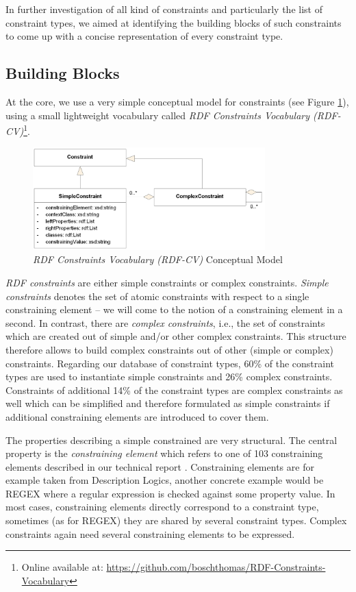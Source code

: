 \documentclass[a4paper,fontsize=11pt]{scrartcl}
\newcommand{\tb}[1]{\todo[size=\small, color=green!40]{\textbf{Thomas:} #1}}
\begin{document}
In further investigation of all kind of constraints and particularly the list of constraint types, we aimed at identifying the building blocks of such constraints to come up with a concise representation of every constraint type. 

\subsection{Building Blocks}

At the core, we use a very simple conceptual model for constraints (see Figure \ref{fig:RDF-CV-conceptual-model}), using a small lightweight vocabulary called \emph{RDF Constraints Vocabulary (RDF-CV)}\footnote{Online available at: \url{https://github.com/boschthomas/RDF-Constraints-Vocabulary}}.\tb{ToDo: actualize vocabulary}
\begin{figure}[H]
	\centering
		\includegraphics[width=0.80\textwidth]{images/RDF-CV.png}
	\caption{\emph{RDF Constraints Vocabulary (RDF-CV)} Conceptual Model}
	\label{fig:RDF-CV-conceptual-model}
\end{figure}

\emph{RDF constraints} are either simple constraints or complex constraints. \emph{Simple constraints} denotes the set of atomic constraints with respect to a single constraining element -- we will come to the notion of a constraining element in a second. In contrast, there are \emph{complex constraints}, i.e., the set of constraints which are created out of simple and/or other complex constraints. This structure therefore allows to build complex constraints out of other (simple or complex) constraints. Regarding our database of constraint types, 60\% of the constraint types are used to instantiate simple constraints and 26\% complex constraints. 
Constraints of additional 14\% of the constraint types are complex constraints as well which can be simplified and therefore formulated as simple constraints if additional constraining elements are introduced to cover them.

The properties describing a simple constrained are very structural. The central property is the \emph{constraining element} which refers to one of 103 constraining elements described in our technical report \cite{BoschNolleAcarEckert2015}. Constraining elements are for example taken from Description Logics, another concrete example would be REGEX where a regular expression is checked against some property value. In most cases, constraining elements directly correspond to a constraint type, sometimes (as for REGEX) they are shared by several constraint types. Complex constraints again need several constraining elements to be expressed.
\end{document}
